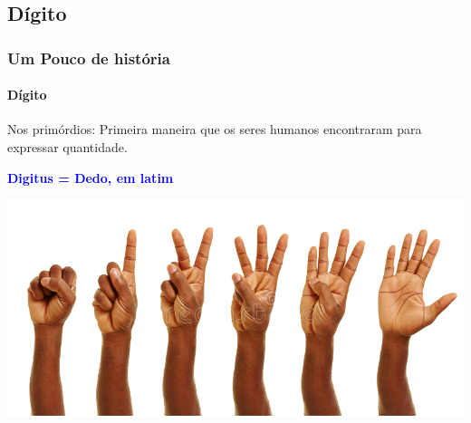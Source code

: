 \documentclass[12pt,a4paper,final]{beamer}
\begin{document}
        \subsection{Dígito}
            \begin{frame}
                \frametitle{Um Pouco de história}
                \framesubtitle{Dígito}
                \begin{block}{Nos primórdios:}
                    Primeira maneira que os seres humanos encontraram para expressar quantidade.
                \end{block}
                \begin{block}{}
                    \centering
                    \textcolor{blue}{\large \textbf{Digitus = Dedo, em latim}}
                \end{block}
                \begin{block}{}
                     \centering
                     \includegraphics[scale=1]{Imagens/maos.png}
                \end{block}
            \end{frame}
\end{document}
